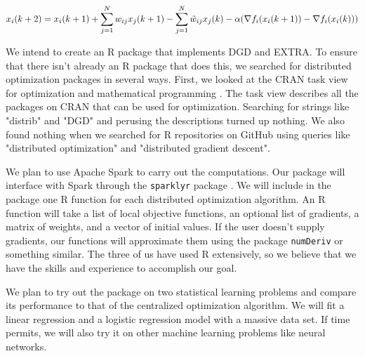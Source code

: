 \documentclass[11pt]{article}
\begin{document}
$$x_i(k+2) = x_i(k+1) + \sum_{j=1}^N w_{ij}x_j(k+1) - \sum_{j=1}^N \Tilde{w}_{ij}x_j(k) - \alpha(\nabla f_i (x_i(k+1)) - \nabla f_i (x_i(k)))$$

We intend to create an R package that implements DGD and EXTRA. To ensure that there isn't already an R package that does this, we searched for distributed optimization packages in several ways. First, we looked at the CRAN task view for optimization and mathematical programming \cite{Theussl:2022}. The task view describes all the packages on CRAN that can be used for optimization. Searching for strings like "distrib" and "DGD" and perusing the descriptions turned up nothing. We also found nothing when we searched for R repositories on GitHub using queries like "distributed optimization" and "distributed gradient descent".

We plan to use Apache Spark to carry out the computations. Our package will interface with Spark through the \texttt{sparklyr} package \cite{Luraschi:2022}. We will include in the package one R function for each distributed optimization algorithm. An R function will take a list of local objective functions, an optional list of gradients, a matrix of weights, and a vector of initial values. If the user doesn't supply gradients, our functions will approximate them using the package \texttt{numDeriv} \cite{Gilbert:2019} or something similar. The three of us have used R extensively, so we believe that we have the skills and experience to accomplish our goal.

We plan to try out the package on two statistical learning problems and compare its performance to that of the centralized optimization algorithm. We will fit a linear regression and a logistic regression model with a massive data set. If time permits, we will also try it on other machine learning problems like neural networks.

\newpage

\end{document}
